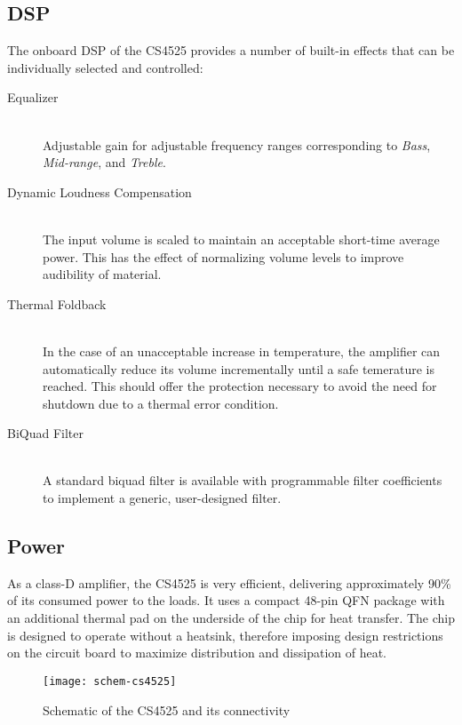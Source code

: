 \subsection{DSP}
\label{sec:dsp}
The onboard DSP of the CS4525 provides a number of built-in effects that can be individually selected and controlled:
\begin{description}
\item[Equalizer] \hfill \\
Adjustable gain for adjustable frequency ranges corresponding to \emph{Bass}, \emph{Mid-range}, and \emph{Treble}. 
\item[Dynamic Loudness Compensation] \hfill \\
The input volume is scaled to maintain an acceptable short-time average power. This has the effect of normalizing volume levels to improve audibility of material.
\item[Thermal Foldback] \hfill \\
In the case of an unacceptable increase in temperature, the amplifier can automatically reduce its volume incrementally until a safe temerature is reached. This should offer the protection necessary to avoid the need for shutdown due to a thermal error condition.
\item[BiQuad Filter] \hfill \\
A standard biquad filter is available with programmable filter coefficients to implement a generic, user-designed filter.
\end{description}

\subsection{Power}
As a class-D amplifier, the CS4525 is very efficient, delivering approximately 90\% of its consumed power to the loads. It uses a compact 48-pin QFN package with an additional thermal pad on the underside of the chip for heat transfer. The chip is designed to operate without a heatsink, therefore imposing design restrictions on the circuit board to maximize distribution and dissipation of heat.
\begin{figure}[H]
	\centering
	\texttt{[image: schem-cs4525]}
	\caption[Schematic -- CS4525 Amplifier]%
	{Schematic of the CS4525 and its connectivity}
\end{figure}


